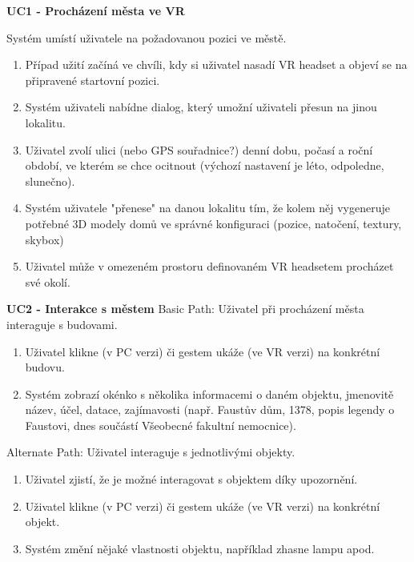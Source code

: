 \documentclass[thesis=B,czech]{FITthesis}[2012/06/26]
\begin{document}
	\begin{description}
	
 		\item \textbf{UC1 - Procházení města ve VR}
 		
 			Systém umístí uživatele na požadovanou pozici ve městě.
 		 	
 		 	\begin{enumerate}
 		 		\item Případ užití začíná ve chvíli, kdy si uživatel nasadí VR headset a objeví se na připravené startovní pozici.
				\item Systém uživateli nabídne dialog, který umožní uživateli přesun na jinou lokalitu.
				\item Uživatel zvolí ulici (nebo GPS souřadnice?) denní dobu, počasí a roční období, ve kterém se chce ocitnout (výchozí nastavení je léto, odpoledne, slunečno).
				\item Systém uživatele "přenese" na danou lokalitu tím, že kolem něj vygeneruje potřebné 3D modely domů ve správné konfiguraci (pozice, natočení, textury, skybox)
				\item Uživatel může v omezeném prostoru definovaném VR headsetem procházet své okolí.
			\end{enumerate} 		 			
 			

 		\item \textbf{UC2 - Interakce s městem}
		Basic Path: Uživatel při procházení města interaguje s budovami. 		
 		
 		\begin{enumerate}
				\item Uživatel klikne (v PC verzi) či gestem ukáže (ve VR verzi) na konkrétní budovu.
				\item Systém zobrazí okénko s několika informacemi o daném objektu, jmenovitě název, účel, datace, zajímavosti (např. Faustův dům, 1378, popis legendy o Faustovi, dnes součástí Všeobecné fakultní nemocnice).
 		\end{enumerate}
 		
 		Alternate Path: Uživatel interaguje s jednotlivými objekty.
 		\begin{enumerate}
				\item Uživatel zjistí, že je možné interagovat s objektem díky upozornění.
				\item Uživatel klikne (v PC verzi) či gestem ukáže (ve VR verzi) na konkrétní objekt.
				\item Systém změní nějaké vlastnosti objektu, například zhasne lampu apod.
 		\end{enumerate}
 		

\end{description}
\end{document}
